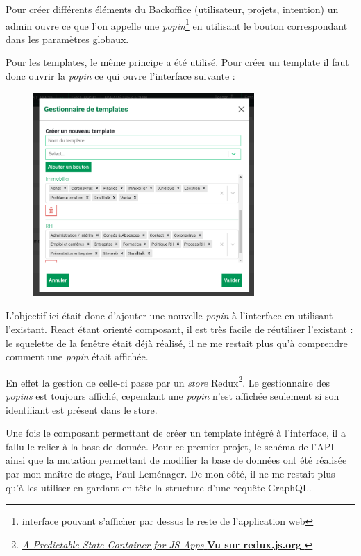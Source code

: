 \documentclass[12pt,a4paper,oneside]{scrreprt}
\begin{document}
Pour créer différents éléments du Backoffice (utilisateur, projets, intention) un admin ouvre ce que l'on appelle une \textit{popin}\footnote{interface pouvant s'afficher par dessus le reste de l'application web} en utilisant le bouton correspondant dans les paramètres globaux.

Pour les templates, le même principe a été utilisé. Pour créer un template il faut donc ouvrir la \textit{popin} ce qui ouvre l'interface suivante :

\begin{figure}[!ht]
\centering
	\includegraphics[width=0.75\textwidth]{pictures/popin_create_templates.png}
\end{figure}

L'objectif ici était donc d'ajouter une nouvelle \textit{popin} à l'interface en utilisant l'existant. React étant orienté composant, il est très facile de réutiliser l'existant : le squelette de la fenêtre était déjà réalisé, il ne me restait plus qu'à comprendre comment une \textit{popin} était affichée.

En effet la gestion de celle-ci passe par un \textit{store} Redux\footnote{\href{https://redux.js.org}{\og\textit{A Predictable State Container for JS Apps}\fg{} \textbf{Vu sur redux.js.org} }}. Le gestionnaire des \textit{popins} est toujours affiché, cependant une \textit{popin} n'est affichée seulement si son identifiant est présent dans le store.

Une fois le composant permettant de créer un template intégré à l'interface, il a fallu le relier à la base de donnée. Pour ce premier projet, le schéma de l'API ainsi que la mutation permettant de modifier la base de données ont été réalisée par mon maître de stage, Paul Leménager. De mon côté, il ne me restait plus qu'à les utiliser en gardant en tête la structure d'une requête GraphQL.
\end{document}
